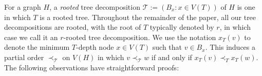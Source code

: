 \documentclass[kpfonts]{patmorin}
\DeclareMathOperator{\pw}{pw}
\theoremstyle{named}
\begin{document}
%
%
%



For a graph $H$, a \emph{rooted} tree decomposition $\mathcal{T}:=(B_x:x\in V(T))$ of $H$ is one in which $T$ is a rooted tree.  Throughout the remainder of the paper, all our tree decompositions are rooted, with the root of $T$ typically denoted by $r$, in which case we call it an $r$-rooted tree decomposition.  We use the notation $x_T(v)$ to denote the minimum $T$-depth node $x\in V(T)$ such that $v\in B_x$.  This induces a partial order $\prec_{\mathcal{T}}$ on $V(H)$ in which $v\prec_{\mathcal{T}} w$ if and only if $x_T(v)\prec_T x_T(w)$.  The following observations have straightforward proofs:
\end{document}
